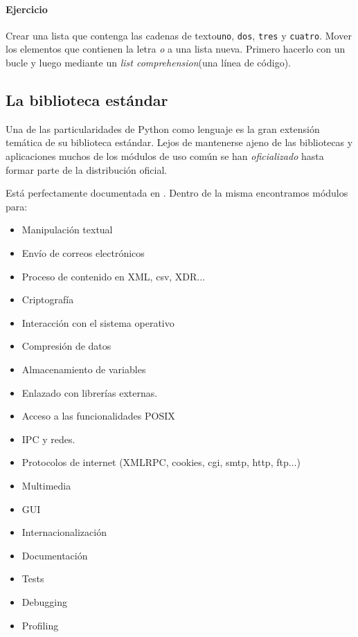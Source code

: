 \documentclass[a4paper,10pt]{article}
\begin{document}
\begin{small}
  \paragraph*{Ejercicio}
  Crear una lista que contenga las cadenas de texto\texttt{uno},
  \texttt{dos}, \texttt{tres} y \texttt{cuatro}.  Mover los elementos
  que contienen la letra \emph{o} a una lista nueva. Primero hacerlo
  con un bucle y luego mediante un \emph{list comprehension}(una línea
  de código).
\end{small}


\subsection{La biblioteca estándar}

Una de las particularidades de Python como lenguaje es la gran
extensión temática de su biblioteca estándar.  Lejos de mantenerse
ajeno de las bibliotecas y aplicaciones muchos de los módulos de uso
común se han \emph{oficializado} hasta formar parte de la distribución
oficial.

Está perfectamente documentada en \cite{STB}. Dentro de la misma
encontramos módulos para:

\begin{itemize}
\item Manipulación textual
\item Envío de correos electrónicos
\item Proceso de contenido en XML, csv, XDR...
\item Criptografía
\item Interacción con el sistema operativo
\item Compresión de datos
\item Almacenamiento de variables
\item Enlazado con librerías externas.
\item Acceso a las funcionalidades POSIX
\item IPC y redes.
\item Protocolos de internet (XMLRPC, cookies, cgi, smtp, http, ftp...)
\item Multimedia
\item GUI
\item Internacionalización
\item Documentación
\item Tests
\item Debugging
\item Profiling
\end{itemize}
\end{document}
